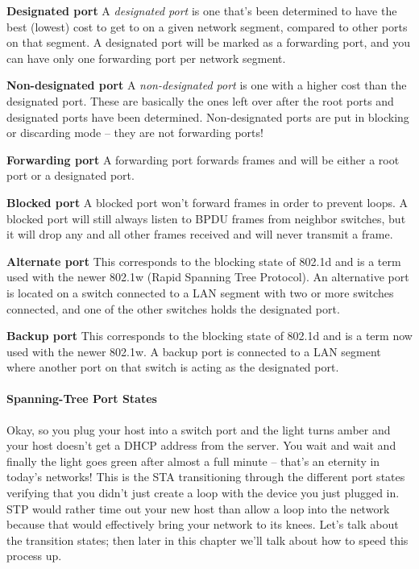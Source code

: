 \textbf{Designated port} A \emph{designated port} is one that's been
determined to have the best (lowest) cost to get to on a given network
segment, compared to other ports on that segment. A designated port will
be marked as a forwarding port, and you can have only one forwarding
port per network segment.

\textbf{Non-designated port} A \emph{non-designated port} is one with a
higher cost than the designated port. These are basically the ones left
over after the root ports and designated ports have
been determined.
Non-designated ports are put in blocking or discarding mode -- they are
not forwarding ports!

\textbf{Forwarding port} A forwarding port forwards frames and will be
either a root port or a designated port.

\textbf{Blocked port} A blocked port won't forward frames in order to
prevent loops. A blocked port will still always listen to BPDU frames
from neighbor switches, but it will drop any and all other frames
received and will never transmit a frame.

\textbf{Alternate port} This corresponds to the blocking state of 802.1d
and is a term used with the newer 802.1w (Rapid Spanning Tree Protocol).
An alternative port is located on a switch connected to a LAN segment
with two or more switches connected, and one of the other switches holds
the designated port.

\textbf{Backup port} This corresponds to the blocking state of 802.1d
and is a term now used with the newer 802.1w. A backup port is connected
to a LAN segment where another port on that switch is acting as the
designated port.

\paragraph{Spanning-Tree Port States}

Okay, so you plug your host into a switch port and the light turns amber
and your host doesn't get a DHCP address from the server. You wait and
wait and finally the light goes green after almost a full
minute -- that's an eternity in today's networks! This is the STA
transitioning through the different port states verifying that you
didn't just create a loop with the device you just plugged in. STP would
rather time out your new host than allow a loop into the network because
that would effectively bring your network to its knees. Let's talk about
the transition states; then later in this chapter we'll talk about how
to speed this process up.

